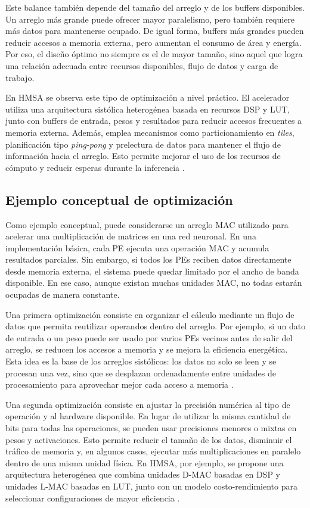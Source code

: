 \documentclass[conference]{IEEEtran}
\begin{document}
Este balance también depende del tamaño del arreglo y de los buffers disponibles. Un arreglo más grande puede ofrecer mayor paralelismo, pero también requiere más datos para mantenerse ocupado. De igual forma, buffers más grandes pueden reducir accesos a memoria externa, pero aumentan el consumo de área y energía. Por eso, el diseño óptimo no siempre es el de mayor tamaño, sino aquel que logra una relación adecuada entre recursos disponibles, flujo de datos y carga de trabajo.

En HMSA se observa este tipo de optimización a nivel práctico. El acelerador utiliza una arquitectura sistólica heterogénea basada en recursos DSP y LUT, junto con buffers de entrada, pesos y resultados para reducir accesos frecuentes a memoria externa. Además, emplea mecanismos como particionamiento en \textit{tiles}, planificación tipo \textit{ping-pong} y prelectura de datos para mantener el flujo de información hacia el arreglo. Esto permite mejorar el uso de los recursos de cómputo y reducir esperas durante la inferencia \cite{cao2025hmsa}.

\subsection{Ejemplo conceptual de optimización}

Como ejemplo conceptual, puede considerarse un arreglo MAC utilizado para acelerar una multiplicación de matrices en una red neuronal. En una implementación básica, cada PE ejecuta una operación MAC y acumula resultados parciales. Sin embargo, si todos los PEs reciben datos directamente desde memoria externa, el sistema puede quedar limitado por el ancho de banda disponible. En ese caso, aunque existan muchas unidades MAC, no todas estarán ocupadas de manera constante.

Una primera optimización consiste en organizar el cálculo mediante un flujo de datos que permita reutilizar operandos dentro del arreglo. Por ejemplo, si un dato de entrada o un peso puede ser usado por varios PEs vecinos antes de salir del arreglo, se reducen los accesos a memoria y se mejora la eficiencia energética. Esta idea es la base de los arreglos sistólicos: los datos no solo se leen y se procesan una vez, sino que se desplazan ordenadamente entre unidades de procesamiento para aprovechar mejor cada acceso a memoria \cite{xu2023survey}.

Una segunda optimización consiste en ajustar la precisión numérica al tipo de operación y al hardware disponible. En lugar de utilizar la misma cantidad de bits para todas las operaciones, se pueden usar precisiones menores o mixtas en pesos y activaciones. Esto permite reducir el tamaño de los datos, disminuir el tráfico de memoria y, en algunos casos, ejecutar más multiplicaciones en paralelo dentro de una misma unidad física. En HMSA, por ejemplo, se propone una arquitectura heterogénea que combina unidades D-MAC basadas en DSP y unidades L-MAC basadas en LUT, junto con un modelo costo-rendimiento para seleccionar configuraciones de mayor eficiencia \cite{cao2025hmsa}.
\end{document}
